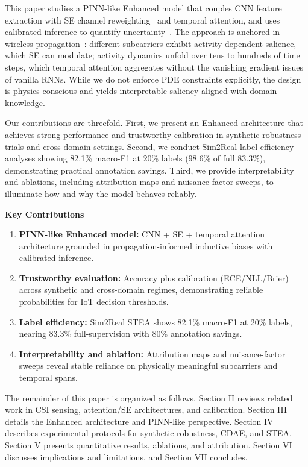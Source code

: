 \documentclass[journal]{IEEEtran}
\begin{document}
This paper studies a PINN-like Enhanced model that couples CNN feature extraction with SE channel reweighting~\cite{se_networks2018} and temporal attention, and uses calibrated inference to quantify uncertainty~\cite{calibration_guo2017}. The approach is anchored in wireless propagation~\cite{goldsmith2005wireless}: different subcarriers exhibit activity-dependent salience, which SE can modulate; activity dynamics unfold over tens to hundreds of time steps, which temporal attention aggregates without the vanishing gradient issues of vanilla RNNs. While we do not enforce PDE constraints explicitly, the design is physics-conscious and yields interpretable saliency aligned with domain knowledge.

Our contributions are threefold. First, we present an Enhanced architecture that achieves strong performance and trustworthy calibration in synthetic robustness trials and cross-domain settings. Second, we conduct Sim2Real label-efficiency analyses showing 82.1\% macro-F1 at 20\% labels (98.6\% of full 83.3\%), demonstrating practical annotation savings. Third, we provide interpretability and ablations, including attribution maps and nuisance-factor sweeps, to illuminate how and why the model behaves reliably.

\textbf{Key Contributions}
\begin{enumerate}
  \item \textbf{PINN-like Enhanced model:} CNN + SE + temporal attention architecture grounded in propagation-informed inductive biases with calibrated inference.
  \item \textbf{Trustworthy evaluation:} Accuracy plus calibration (ECE/NLL/Brier) across synthetic and cross-domain regimes, demonstrating reliable probabilities for IoT decision thresholds.
  \item \textbf{Label efficiency:} Sim2Real STEA shows 82.1\% macro-F1 at 20\% labels, nearing 83.3\% full-supervision with 80\% annotation savings.
  \item \textbf{Interpretability and ablation:} Attribution maps and nuisance-factor sweeps reveal stable reliance on physically meaningful subcarriers and temporal spans.
\end{enumerate}

The remainder of this paper is organized as follows. Section II reviews related work in CSI sensing, attention/SE architectures, and calibration. Section III details the Enhanced architecture and PINN-like perspective. Section IV describes experimental protocols for synthetic robustness, CDAE, and STEA. Section V presents quantitative results, ablations, and attribution. Section VI discusses implications and limitations, and Section VII concludes.
\end{document}
